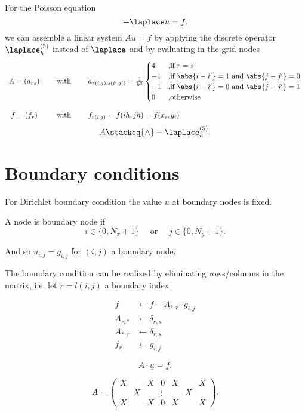For the Poisson equation
\[
-\laplace u = f
.\] 
we can assemble a linear system $Au=f$ by applying the discrete operator $\laplace_{h}^{(5)}$ instead of $\laplace$ and by evaluating in the grid nodes
\[
	\begin{array}{ccl}
	A = (a_{rs}) 
	\quad&\text{ with }\quad 
	&a_{r(i,j),s(i',j')}= \frac{1}{h^{2}}\begin{cases}
		4 &\text{,if } r=s \\
		-1 &\text{,if } \abs{i-i'} = 1 \text{ and } \abs{j-j'} = 0 \\
		-1 &\text{,if } \abs{i-i'} = 0 \text{ and } \abs{j-j'} = 1 \\
		0 &\text{,otherwise}
	\end{cases} \\ \\
	f = (f_{r}) 
	\quad&\text{ with }\quad
	&f_{r(i,j)}=f(ih, jh)=f(x_{i}, y_{i})
	\end{array}
\] 
\[
	 A \stackeq{\wedge} -\laplace_{h}^{(5)}
.\] 

\section{Boundary conditions}%
\label{sec:Boundary condition}
For Dirichlet boundary condition the value $u$ at boundary nodes is fixed.

A node is boundary node if
\[
i \in  \{0, N_{x}+1\} \quad\text{ or }\quad j \in  \{0,N_{y}+1\}
.\] 

And so $u_{i,j} = g_{i,j}$ for $(i,j)$ a boundary node.

The boundary condition can be realized by eliminating rows/columns in the matrix, i.e. let $r=l(i,j)$ a boundary index

\begin{align*}
	f &\leftarrow f-A_{\ast,r}\cdot g_{i,j} \\
	A_{r,\ast} &\leftarrow \delta_{r,s} \\
	A_{*,r} &\leftarrow \delta_{r,s} \\
	f_{r} &\leftarrow g_{i,j}
\end{align*}

\[
A\cdot \underline{u} = \underline{f}  
.\] 

\[
A = \begin{pmatrix}
	X& &X&0&X& &X \\
	 &X& &\vdots& &X&  \\
	X& &X&0&X& &X
	\end{pmatrix}
.\] 

